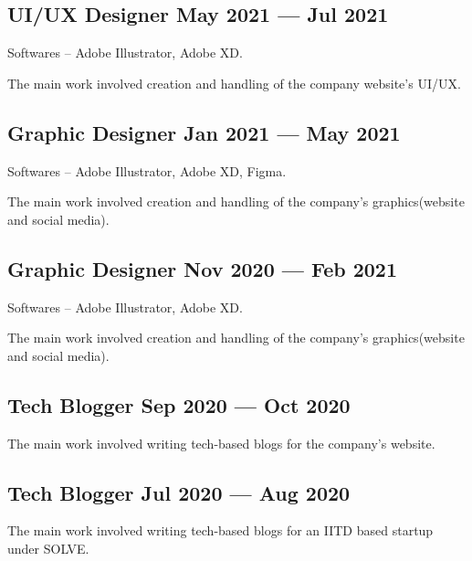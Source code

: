 \documentclass[letter,10pt]{article}
\begin{document}
\subsection{{UI/UX Designer \hfill May 2021 --- Jul 2021}}
\begin{zitemize}
\item Softwares -- Adobe Illustrator, Adobe XD.
\item The main work involved creation and handling of the company website's UI/UX.
\end{zitemize}

\subsection{{Graphic Designer \hfill Jan 2021 --- May 2021}}
\begin{zitemize}
\item Softwares -- Adobe Illustrator, Adobe XD, Figma.
\item The main work involved creation and handling of the company's graphics(website and social media).
\end{zitemize}

\subsection{{Graphic Designer \hfill Nov 2020 --- Feb 2021}}
\begin{zitemize}
\item Softwares -- Adobe Illustrator, Adobe XD.
\item The main work involved creation and handling of the company's graphics(website and social media).
\end{zitemize}

\subsection{{Tech Blogger \hfill Sep 2020 --- Oct 2020}}
\begin{zitemize}
\item The main work involved writing tech-based blogs for the company's website.
\end{zitemize}

\subsection{{Tech Blogger \hfill Jul 2020 --- Aug 2020}}
\begin{zitemize}
\item The main work involved writing tech-based blogs for an IITD based startup under SOLVE.
\end{zitemize}
\end{document}
